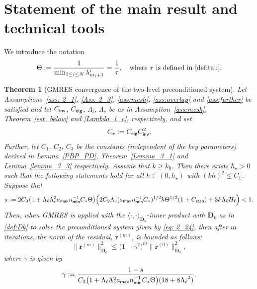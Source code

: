 \documentclass[numbers,webpdf,imaiai]{ima-authoring-template}%
\theoremstyle{thmstyletwo}%
\newtheorem{theorem}{Theorem}[section]
\numberwithin{equation}{section}
\newcommand{\Ceig}{C_{\textup{\textsf{eig}}}} %
\newcommand{\Cinv}{C_{\textup{\textsf{inv}}}}
\newcommand{\Cinvt}{C^2_{\textup{\textsf{inv}}}}
\newcommand{\Cstar}{C_{\ast}}
\newcommand{\assign}{\mathrel{\mathop:}=}
\numberwithin{equation}{section}
\newcommand{\Cstab}{C_{\textup{\textsf{stab}}}}
\newcommand{\amax}{a_{\textup{\textsf{max}}}}
\newcommand{\nmin}{n_{\textup{\textsf{min}}}}
\renewcommand{\kappa}{k}
\begin{document}
{\section{Statement of the main result and technical tools}
\label{sec:theory}

We introduce the notation
\begin{align} 
  \Theta \assign \frac{1}{\min_{1 \le i \le N} \lambda^i_{m_i+1}} = {\frac{1}{\tau}}, \quad \text{where} 
  \ \tau \ \text{is defined in \eqref{def:tau}}. 
\label{notation:theta}
\end{align}


\begin{theorem}[GMRES convergence of the two-level preconditioned system] \label{theorem: convergence}
Let Assumptions~\ref{ass: 2_1}, \ref{Ass: 2_3}, \ref{ass:mesh}, \ref{ass:overlap} and \ref{ass:further} be satisfied
and let $\Cinv$, $\Ceig$, $\Lambda_l$, $\Lambda_c$ be as in Assumption~\ref{ass:mesh},
Theorem~\ref{est_below} and \eqref{Lambda_l_c}, respectively, and set
\begin{align}\label{Cstar}
	\Cstar \assign \Ceig \Cinvt.
\end{align}
Further, let $C_1$, $C_2$, $C_3$ be the constants (independent of the key parameters) derived in 
Lemma~\ref{PBP_PD}, Theorem~\ref{Lemma_3_1} and Lemma~\ref{lemma_3_3} respectively.
Assume that $k\ge k_0$.
Then there exists $h_{\star}>0$ such that the following statements hold for all $h\in(0,h_{\star})$ with $(kh)^2 \le C_1$. 
Suppose that
\begin{equation}
\label{eq: 4_3}
	s \assign 2{C_3}\bigl(1+\Lambda_\ell \Lambda_c^2 {\amax \nmin^{-1}} \Cstar \Theta \bigr)\Bigl({2 C_2\Lambda_c
	(\amax \nmin^{-1}\Cstar)^{1/2}k\Theta^{1/2}}(1+\Cstab)+3k\Lambda_\ell H_\ell\Bigr) < 1.
\end{equation}
Then, when GMRES is applied with the $\langle\cdot,\cdot\rangle_{\mathbf{D}_k}$-inner product with $\mathbf{D}_\kappa$ as in \eqref{def:Dk} 
to solve the preconditioned system given by \eqref{eq: 2_24}, then after $m$ iterations, the norm of the residual, $\mathbf{r}^{(m)}$, 
is bounded as follows:
\begin{equation}\label{eq: 4_22}
	\|\mathbf{r}^{(m)}\|_{\mathbf{D}_{\kappa}}^2 \le \bigl(1-\gamma^2\bigr)^m \|\mathbf{r}^{(0)}\|_{\mathbf{D}_{\kappa}}^2, 
\end{equation} 
where $\gamma$ is given by
\begin{equation}\label{def_gamma}
	\gamma \assign \frac{1-s}{C_3\bigl(1+\Lambda_\ell\Lambda_c^2\amax\nmin^{-1}\Cstar \Theta\bigr)(18 + 8 {\Lambda_{\ell}}^2)}.
\end{equation}
\end{theorem}


}
\end{document}
